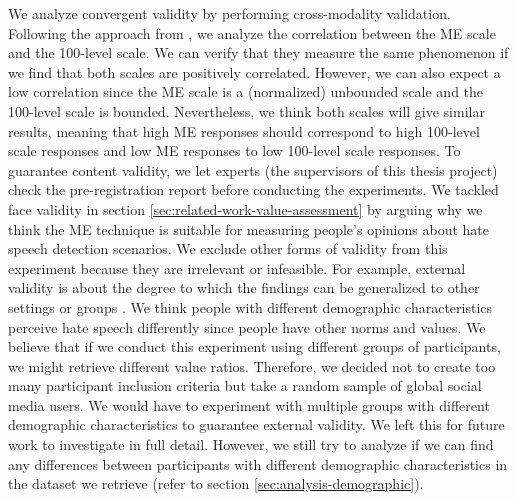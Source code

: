 %
We analyze convergent validity by performing cross-modality validation.
%
Following the approach from \citet{roitero2018fine}, we analyze the correlation between the ME scale and the 100-level scale.
%
We can verify that they measure the same phenomenon if we find that both scales are positively correlated.
%
However, we can also expect a low correlation since the ME scale is a (normalized) unbounded scale and the 100-level scale is bounded.
%
Nevertheless, we think both scales will give similar results, meaning that high ME responses should correspond to high 100-level scale responses and low ME responses to low 100-level scale responses.
%
To guarantee content validity, we let experts (the supervisors of this thesis project) check the pre-registration report before conducting the experiments.
%
We tackled face validity in section \ref{sec:related-work-value-assessment} by arguing why we think the ME technique is suitable for measuring people's opinions about hate speech detection scenarios.
%
We exclude other forms of validity from this experiment because they are irrelevant or infeasible.
%
For example, external validity is about the degree to which the findings can be generalized to other settings or groups \citep{fitzner2007reliability}.
%
We think people with different demographic characteristics perceive hate speech differently since people have other norms and values.
%
We believe that if we conduct this experiment using different groups of participants, we might retrieve different value ratios.
%
Therefore, we decided not to create too many participant inclusion criteria but take a random sample of global social media users.
%
We would have to experiment with multiple groups with different demographic characteristics to guarantee external validity.
%
We left this for future work to investigate in full detail.
%
However, we still try to analyze if we can find any differences between participants with different demographic characteristics in the dataset we retrieve (refer to section \ref{sec:analysis-demographic}).

